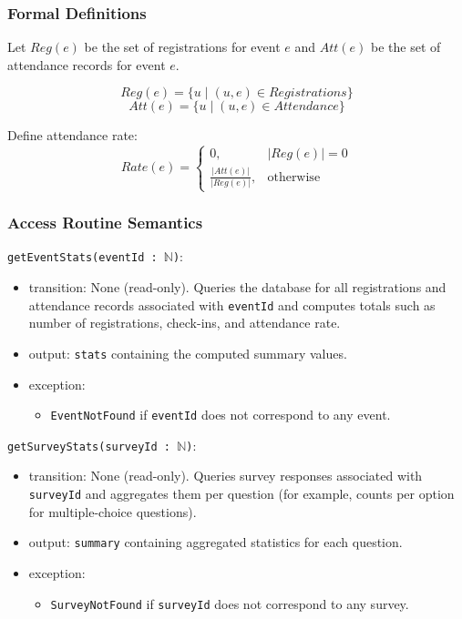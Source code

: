 \documentclass[12pt, titlepage]{article}
\begin{document}
\subsubsection{Formal Definitions}

Let $Reg(e)$ be the set of registrations for event $e$ and $Att(e)$ be the set of attendance records for event $e$.

\[
Reg(e) = \{ u \mid (u,e) \in Registrations \}
\]
\[
Att(e) = \{ u \mid (u,e) \in Attendance \}
\]

Define attendance rate:
\[
Rate(e) =
\begin{cases}
0, & |Reg(e)| = 0 \\
\frac{|Att(e)|}{|Reg(e)|}, & \text{otherwise}
\end{cases}
\]


\subsubsection{Access Routine Semantics}

\noindent \texttt{getEventStats(eventId : $\mathbb{N}$)}:
\begin{itemize}
  \item transition: None (read-only). Queries the database for all registrations
        and attendance records associated with \texttt{eventId} and computes
        totals such as number of registrations, check-ins, and attendance rate.
  \item output: \texttt{stats} containing the computed summary values.
  \item exception:
    \begin{itemize}
      \item \texttt{EventNotFound} if \texttt{eventId} does not correspond to any event.
    \end{itemize}
\end{itemize}

\noindent \texttt{getSurveyStats(surveyId : $\mathbb{N}$)}:
\begin{itemize}
  \item transition: None (read-only). Queries survey responses associated with
        \texttt{surveyId} and aggregates them per question (for example,
        counts per option for multiple-choice questions).
  \item output: \texttt{summary} containing aggregated statistics for each question.
  \item exception:
    \begin{itemize}
      \item \texttt{SurveyNotFound} if \texttt{surveyId} does not correspond to any survey.
    \end{itemize}
\end{itemize}
\end{document}
